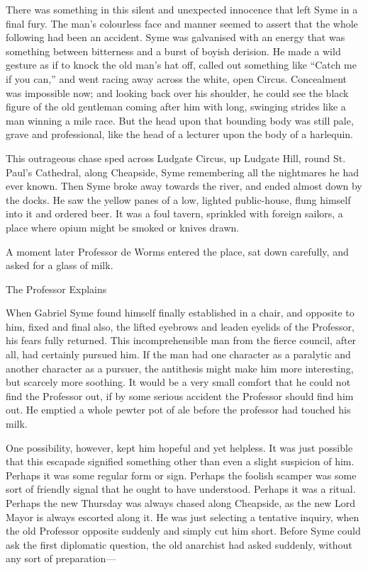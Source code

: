 There was something in this silent and unexpected innocence that left Syme in a final fury. The man’s colourless face and manner seemed to assert that the whole following had been an accident. Syme was galvanised with an energy that was something between bitterness and a burst of boyish derision. He made a wild gesture as if to knock the old man’s hat off, called out something like “Catch me if you can,” and went racing away across the white, open Circus. Concealment was impossible now; and looking back over his shoulder, he could see the black figure of the old gentleman coming after him with long, swinging strides like a man winning a mile race. But the head upon that bounding body was still pale, grave and professional, like the head of a lecturer upon the body of a harlequin.

This outrageous chase sped across Ludgate Circus, up Ludgate Hill, round St. Paul’s Cathedral, along Cheapside, Syme remembering all the nightmares he had ever known. Then Syme broke away towards the river, and ended almost down by the docks. He saw the yellow panes of a low, lighted public-house, flung himself into it and ordered beer. It was a foul tavern, sprinkled with foreign sailors, a place where opium might be smoked or knives drawn.

A moment later Professor de Worms entered the place, sat down carefully, and asked for a glass of milk.

\chap The Professor Explains

When Gabriel Syme found himself finally established in a chair, and opposite to him, fixed and final also, the lifted eyebrows and leaden eyelids of the Professor, his fears fully returned. This incomprehensible man from the fierce council, after all, had certainly pursued him. If the man had one character as a paralytic and another character as a pursuer, the antithesis might make him more interesting, but scarcely more soothing. It would be a very small comfort that he could not find the Professor out, if by some serious accident the Professor should find him out. He emptied a whole pewter pot of ale before the professor had touched his milk.

One possibility, however, kept him hopeful and yet helpless. It was just possible that this escapade signified something other than even a slight suspicion of him. Perhaps it was some regular form or sign. Perhaps the foolish scamper was some sort of friendly signal that he ought to have understood. Perhaps it was a ritual. Perhaps the new Thursday was always chased along Cheapside, as the new Lord Mayor is always escorted along it. He was just selecting a tentative inquiry, when the old Professor opposite suddenly and simply cut him short. Before Syme could ask the first diplomatic question, the old anarchist had asked suddenly, without any sort of preparation⁠—

